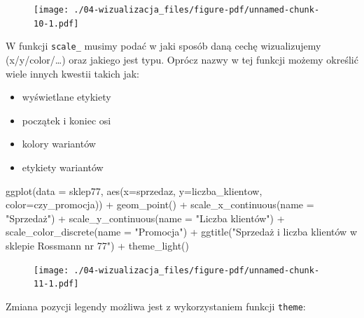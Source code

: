 \documentclass[
  letterpaper,
  DIV=11,
  numbers=noendperiod]{scrreprt}
\newenvironment{Shaded}{\begin{snugshade}}{\end{snugshade}}
\newcommand{\AttributeTok}[1]{\textcolor[rgb]{0.40,0.45,0.13}{#1}}
\newcommand{\FunctionTok}[1]{\textcolor[rgb]{0.28,0.35,0.67}{#1}}
\newcommand{\NormalTok}[1]{\textcolor[rgb]{0.00,0.23,0.31}{#1}}
\newcommand{\SpecialCharTok}[1]{\textcolor[rgb]{0.37,0.37,0.37}{#1}}
\newcommand{\StringTok}[1]{\textcolor[rgb]{0.13,0.47,0.30}{#1}}
\providecommand{\tightlist}{%
  \setlength{\itemsep}{0pt}\setlength{\parskip}{0pt}}\usepackage{longtable,booktabs,array}
\begin{document}
\begin{figure}[H]

{\centering \texttt{[image: ./04-wizualizacja\_files/figure-pdf/unnamed-chunk-10-1.pdf]}

}

\end{figure}

W funkcji \texttt{scale\_} musimy podać w jaki sposób daną cechę
wizualizujemy (x/y/color/\ldots) oraz jakiego jest typu. Oprócz nazwy w
tej funkcji możemy określić wiele innych kwestii takich jak:

\begin{itemize}
\tightlist
\item
  wyświetlane etykiety
\item
  początek i koniec osi
\item
  kolory wariantów
\item
  etykiety wariantów
\end{itemize}

\begin{Shaded}
\begin{Highlighting}[]
\FunctionTok{ggplot}\NormalTok{(}\AttributeTok{data =}\NormalTok{ sklep77, }\FunctionTok{aes}\NormalTok{(}\AttributeTok{x=}\NormalTok{sprzedaz, }\AttributeTok{y=}\NormalTok{liczba\_klientow, }\AttributeTok{color=}\NormalTok{czy\_promocja)) }\SpecialCharTok{+}
  \FunctionTok{geom\_point}\NormalTok{() }\SpecialCharTok{+}
  \FunctionTok{scale\_x\_continuous}\NormalTok{(}\AttributeTok{name =} \StringTok{"Sprzedaż"}\NormalTok{) }\SpecialCharTok{+}
  \FunctionTok{scale\_y\_continuous}\NormalTok{(}\AttributeTok{name =} \StringTok{"Liczba klientów"}\NormalTok{) }\SpecialCharTok{+}
  \FunctionTok{scale\_color\_discrete}\NormalTok{(}\AttributeTok{name =} \StringTok{"Promocja"}\NormalTok{) }\SpecialCharTok{+}
  \FunctionTok{ggtitle}\NormalTok{(}\StringTok{"Sprzedaż i liczba klientów w sklepie Rossmann nr 77"}\NormalTok{) }\SpecialCharTok{+}
  \FunctionTok{theme\_light}\NormalTok{()}
\end{Highlighting}
\end{Shaded}

\begin{figure}[H]

{\centering \texttt{[image: ./04-wizualizacja\_files/figure-pdf/unnamed-chunk-11-1.pdf]}

}

\end{figure}

Zmiana pozycji legendy możliwa jest z wykorzystaniem funkcji
\texttt{theme}:
\end{document}
